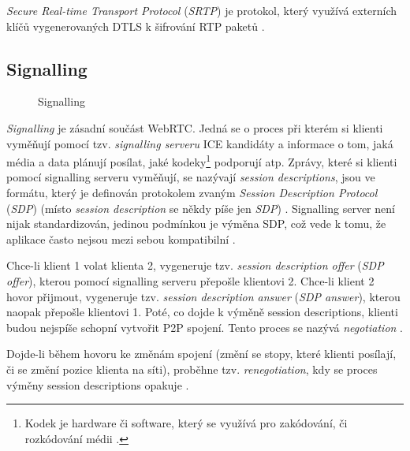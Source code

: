 \textit{Secure Real-time Transport Protocol} (\textit{SRTP}) je protokol, který
využívá externích klíčů vygenerovaných DTLS k šifrování RTP paketů
\cite{WebRTCForTheCurious}.

\subsection{Signalling}\label{signalling}

\begin{figure}[H]
	\centering
	\caption{Signalling}
	\label{signallingServer}
\end{figure}

\textit{Signalling} je zásadní součást WebRTC. Jedná se o proces při kterém si
klienti vyměňují pomocí tzv. \textit{signalling serveru} ICE kandidáty a
informace o tom, jaká média a data plánují posílat, jaké kodeky\footnote{Kodek
je hardware či software, který se využívá pro zakódování, či rozkódování médii
\cite{Britannica-Codec,TechTarget-Codec}.} podporují atp. Zprávy, které si
klienti pomocí signalling serveru vyměňují, se nazývají \textit{session
descriptions}, jsou ve formátu, který je definován protokolem zvaným
\textit{Session Description Protocol} (\textit{SDP}) (místo \textit{session
description} se někdy píše jen \textit{SDP}) \cite{WebRTCForTheCurious}.
Signalling server není nijak standardizován, jedinou podmínkou je výměna SDP,
což vede k tomu, že aplikace často nejsou mezi sebou kompatibilní
\cite{MDN-Web-SignalingAndVideoCalling}.

Chce-li klient 1 volat klienta 2, vygeneruje tzv. \textit{session description
offer} (\textit{SDP offer}), kterou pomocí signalling serveru přepošle klientovi
2. Chce-li klient 2 hovor přijmout, vygeneruje tzv. \textit{session description
answer} (\textit{SDP answer}), kterou naopak přepošle klientovi 1. Poté, co
dojde k výměně session descriptions, klienti budou nejspíše schopní vytvořit P2P
spojení. Tento proces se nazývá
\textit{negotiation}
\cite{WebRTCForTheCurious,MozillaBlog-PerfectNegotiation}.

Dojde-li během hovoru ke změnám spojení (změní se stopy, které klienti posílají,
či se změní pozice klienta na síti), proběhne tzv. \textit{renegotiation}, kdy
se proces výměny session descriptions opakuje
\cite{MozillaBlog-PerfectNegotiation}.

